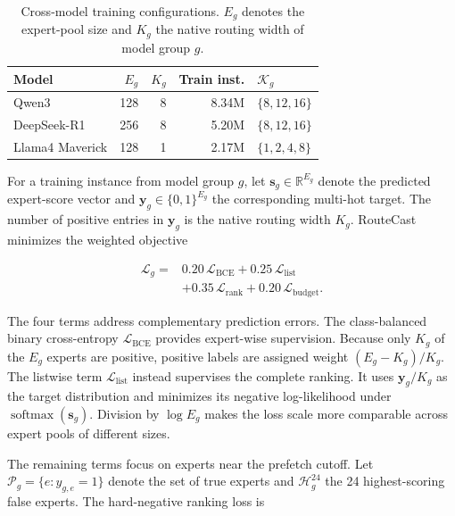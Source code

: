 \documentclass[conference]{IEEEtran}
\begin{document}
\begin{table}[!t]
\centering
\caption{Cross-model training configurations. \(E_g\) denotes the expert-pool
size and \(K_g\) the native routing width of model group \(g\).}
\label{tab:cross-model-config}
\footnotesize
\setlength{\tabcolsep}{3.2pt}
\begin{tabular}{@{}lrrrl@{}}
\toprule
Model & \(E_g\) & \(K_g\) & Train inst. & \(\mathcal{K}_g\) \\
\midrule
Qwen3             & 128 & 8 & 8.34M & \(\{8,12,16\}\) \\
DeepSeek-R1       & 256 & 8 & 5.20M & \(\{8,12,16\}\) \\
Llama4 Maverick   & 128 & 1 & 2.17M & \(\{1,2,4,8\}\) \\
\bottomrule
\end{tabular}
\end{table}

For a training instance from model group \(g\), let
\(\mathbf{s}_{g}\in\mathbb{R}^{E_g}\) denote the predicted expert-score vector
and \(\mathbf{y}_{g}\in\{0,1\}^{E_g}\) the corresponding multi-hot target.
The number of positive entries in \(\mathbf{y}_g\) is the native routing width
\(K_g\). RouteCast minimizes the weighted objective

\begin{equation}
\begin{split}
\mathcal{L}_{g} ={}&
0.20\,\mathcal{L}_{\mathrm{BCE}}
+0.25\,\mathcal{L}_{\mathrm{list}} \\
&+0.35\,\mathcal{L}_{\mathrm{rank}}
+0.20\,\mathcal{L}_{\mathrm{budget}} .
\end{split}
\label{eq:total-loss}
\end{equation}

The four terms address complementary prediction errors.
The class-balanced binary cross-entropy
\(\mathcal{L}_{\mathrm{BCE}}\) provides expert-wise supervision. Because only
\(K_g\) of the \(E_g\) experts are positive, positive labels are assigned
weight \((E_g-K_g)/K_g\). The listwise term
\(\mathcal{L}_{\mathrm{list}}\) instead supervises the complete ranking. It
uses \(\mathbf{y}_g/K_g\) as the target distribution and minimizes its
negative log-likelihood under
\(\operatorname{softmax}(\mathbf{s}_g)\). Division by \(\log E_g\) makes the
loss scale more comparable across expert pools of different sizes.

The remaining terms focus on experts near the prefetch cutoff. Let
\(\mathcal{P}_g=\{e:y_{g,e}=1\}\) denote the set of true experts and
\(\mathcal{H}_g^{24}\) the 24 highest-scoring false experts. The hard-negative
ranking loss is
\end{document}
